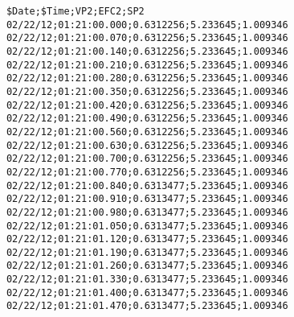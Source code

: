 
    \begin{longlisting}				
        \begin{verbatim}
            $Date;$Time;VP2;EFC2;SP2
            02/22/12;01:21:00.000;0.6312256;5.233645;1.009346
            02/22/12;01:21:00.070;0.6312256;5.233645;1.009346
            02/22/12;01:21:00.140;0.6312256;5.233645;1.009346
            02/22/12;01:21:00.210;0.6312256;5.233645;1.009346
            02/22/12;01:21:00.280;0.6312256;5.233645;1.009346
            02/22/12;01:21:00.350;0.6312256;5.233645;1.009346
            02/22/12;01:21:00.420;0.6312256;5.233645;1.009346
            02/22/12;01:21:00.490;0.6312256;5.233645;1.009346
            02/22/12;01:21:00.560;0.6312256;5.233645;1.009346
            02/22/12;01:21:00.630;0.6312256;5.233645;1.009346
            02/22/12;01:21:00.700;0.6312256;5.233645;1.009346
            02/22/12;01:21:00.770;0.6312256;5.233645;1.009346
            02/22/12;01:21:00.840;0.6313477;5.233645;1.009346
            02/22/12;01:21:00.910;0.6313477;5.233645;1.009346
            02/22/12;01:21:00.980;0.6313477;5.233645;1.009346
            02/22/12;01:21:01.050;0.6313477;5.233645;1.009346
            02/22/12;01:21:01.120;0.6313477;5.233645;1.009346
            02/22/12;01:21:01.190;0.6313477;5.233645;1.009346
            02/22/12;01:21:01.260;0.6313477;5.233645;1.009346
            02/22/12;01:21:01.330;0.6313477;5.233645;1.009346
            02/22/12;01:21:01.400;0.6313477;5.233645;1.009346
            02/22/12;01:21:01.470;0.6313477;5.233645;1.009346

\end{verbatim}
\end{longlisting}
